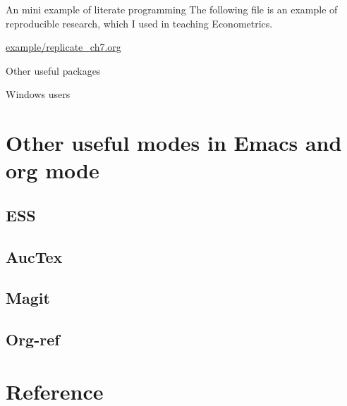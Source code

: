 \documentclass[presentation]{beamer}
\begin{document}
\begin{frame}[label={sec:org7589f7f}]{An mini example of literate programming}
The following file is an example of reproducible research, which I
used in teaching Econometrics.

\url{example/replicate\_ch7.org}
\end{frame}

\begin{frame}[label={sec:org9e25517}]{Other useful packages}
\end{frame}

\begin{frame}[label={sec:org309270e}]{Windows users}
\end{frame}



\section*{Other useful modes in Emacs and org mode}
\label{sec:org8cb67c4}
\subsection*{ESS}
\label{sec:orgeb6f257}
\subsection*{AucTex}
\label{sec:orgf53a73f}
\subsection*{Magit}
\label{sec:org9c4bb02}
\subsection*{Org-ref}
\label{sec:org57881a5}

\section*{Reference}
\label{sec:orgfeaaf74}
\end{document}

